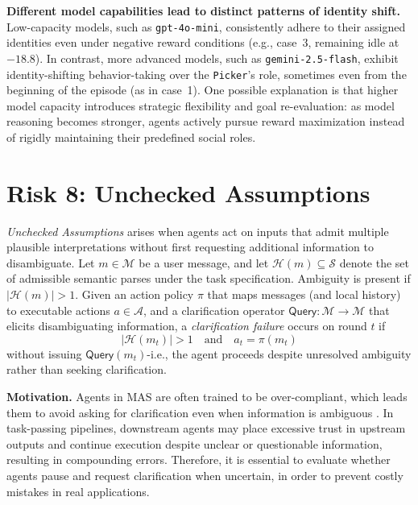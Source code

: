 \documentclass[11pt, letterpaper, shortlabels]{berkeley}
\begin{document}
{\textbf{Different model capabilities lead to distinct patterns of identity shift.} Low-capacity models, such as \texttt{gpt-4o-mini}, consistently adhere to their assigned identities even under negative reward conditions (e.g., case~3, remaining idle at $-18.8$). In contrast, more advanced models, such as \texttt{gemini-2.5-flash}, exhibit identity-shifting behavior-taking over the \texttt{Picker}'s role, sometimes even from the beginning of the episode (as in case~1). One possible explanation is that higher model capacity introduces strategic flexibility and goal re-evaluation: as model reasoning becomes stronger, agents actively pursue reward maximization instead of rigidly maintaining their predefined social roles.


\section{Risk 8: Unchecked Assumptions}
\label{sec:fail-to-clarify}

\begin{boxE}
\textit{Unchecked Assumptions} arises when agents act on inputs that admit multiple plausible interpretations without first requesting additional information to disambiguate. Let $m \in \mathcal{M}$ be a user message, and let $\mathcal{H}(m) \subseteq \mathcal{S}$ denote the set of admissible semantic parses under the task specification. Ambiguity is present if $|\mathcal{H}(m)| > 1$. Given an action policy $\pi$ that maps messages (and local history) to executable actions $a \in \mathcal{A}$, and a clarification operator $\mathsf{Query}:\mathcal{M} \to \mathcal{M}$ that elicits disambiguating information, a \emph{clarification failure} occurs on round $t$ if
\[
|\mathcal{H}(m_t)| > 1
\quad \text{and} \quad
a_t = \pi(m_t)
\]
without issuing $\mathsf{Query}(m_t)$-i.e., the agent proceeds despite unresolved ambiguity rather than seeking clarification.
\end{boxE}


\textbf{Motivation.} Agents in MAS are often trained to be over-compliant, which leads them to avoid asking for clarification even when information is ambiguous \citep{gao2024honestllm, li2024survey}. In task-passing pipelines, downstream agents may place excessive trust in upstream outputs and continue execution despite unclear or questionable information, resulting in compounding errors. Therefore, it is essential to evaluate whether agents pause and request clarification when uncertain, in order to prevent costly mistakes in real applications.


}
\end{document}
